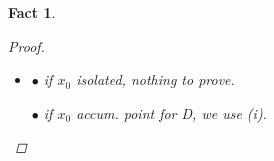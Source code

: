 \documentclass[12pt]{amsbook}
\newtheorem{fact}[theorem]{Fact}
\theoremstyle{definition}
\begin{document}
\begin{fact}
\begin{enumerate}
\begin{proof}
\begin{itemize}
\begin{itemize}
	Take $\delta := \min\{\delta_1, \ldots, \delta_q\} > 0$.
	
	Then $\forall j = 1, \ldots, q$, if $\|x-x_0\|_\infty < \delta \leq \delta_j$ then $|f_j(x) - y^{(0)}_j| < \epsilon$ hence \begin{equation*} \|f(x) - y^{(0)}\|_\infty = \max_{j=1}^q \{|f_j(x) - y^{(0)}_j|\} < \epsilon. \end{equation*}
	\end{itemize}
	
    \item[(ii)]
    $\bullet$ if $x_0$ isolated, nothing to prove.
    
    $\bullet$ if $x_0$ accum. point for D, we use (i). %
    \end{itemize}
    \end{proof}

\end{enumerate}
\end{fact}

\end{document}

